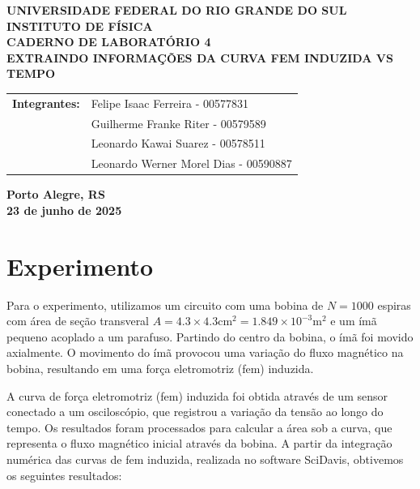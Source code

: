 \documentclass[12pt, a4paper]{article}
\begin{document}
\begin{center}
    \textbf{\large UNIVERSIDADE FEDERAL DO RIO GRANDE DO SUL} \\
    \textbf{\large INSTITUTO DE FÍSICA} \\
    \vspace{3cm}
    \textbf{\Large CADERNO DE LABORATÓRIO 4} \\
    \vspace{1cm}
    \textbf{\large EXTRAINDO INFORMAÇÕES DA CURVA FEM INDUZIDA VS TEMPO} \\
    \vspace{3cm}
    
    \begin{tabular}{rl}
        \textbf{Integrantes:}   & Felipe Isaac Ferreira - 00577831\\
                                & Guilherme Franke Riter - 00579589 \\
                                & Leonardo Kawai Suarez - 00578511 \\
                                & Leonardo Werner Morel Dias - 00590887 \\
    \end{tabular}
    
    \vspace{12cm}
    \textbf{\large Porto Alegre, RS} \\
    \textbf{\large 23 de junho de 2025} \\
\end{center}\newpage

\section{Experimento}

Para o experimento, utilizamos um circuito com uma bobina de $N = 1000$ espiras com área de seção transveral $A = 4.3 \times 4.3 \text{cm}^2 = 1.849 \times 10^{-3} \text{m}^2$ e um ímã pequeno acoplado a um parafuso. Partindo do centro da bobina, o ímã foi movido axialmente. O movimento do ímã provocou uma variação do fluxo magnético na bobina, resultando em uma força eletromotriz (fem) induzida.

A curva de força eletromotriz (fem) induzida foi obtida através de um sensor conectado a um osciloscópio, que registrou a variação da tensão ao longo do tempo. Os resultados foram processados para calcular a área sob a curva, que representa o fluxo magnético inicial através da bobina. A partir da integração numérica das curvas de fem induzida, realizada no software SciDavis, obtivemos os seguintes resultados:
\end{document}
